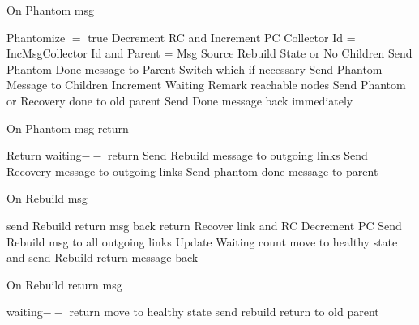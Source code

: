 \documentclass{article}
\begin{document}
\begin{algorithm}
\caption{On Phantom msg}
\label{Phantom message received}
\begin{algorithmic}[1]
\State Phantomize $=$ true
\State Decrement RC and Increment PC
\State Collector Id = IncMsgCollector Id and Parent = Msg Source
\If Rebuild State or No Children
\State Send Phantom Done message to Parent
\Else
\State Switch which if necessary
\State Send Phantom Message to Children
\State Increment Waiting
\EndIf
{}
\State Remark reachable nodes
\State Send Phantom or Recovery done to old parent
\Else
\State Send Done message back immediately
\EndIf
\EndProcedure
\end{algorithmic}
\end{algorithm}	
	
	
\begin{algorithm}
\caption{On Phantom msg return}
\label{Phantom Done message received}
\begin{algorithmic}[1]
\State Return
\EndIf
\State waiting$--$
\State return
\EndIf
{}
\State Send Rebuild message to outgoing links
\State Send Recovery message to outgoing links
\Else
\State Send phantom done message to parent
\EndIf
\EndProcedure
\end{algorithmic}
\end{algorithm}	


	
\begin{algorithm}
\caption{On Rebuild msg}
\label{Rebuild message received}
\begin{algorithmic}[1]
\State send Rebuild return msg back
\State return
\EndIf
\State Recover link and RC
\State Decrement PC
\State Send Rebuild msg to all outgoing links
\State Update Waiting count
\State move to healthy state and send Rebuild return message back
\EndIf
\EndProcedure
\end{algorithmic}
\end{algorithm}	



\begin{algorithm}
\caption{On Rebuild return msg}
\label{Rebuild return message received}
\begin{algorithmic}[1]
\State waiting$--$
\State return
\EndIf
\State move to healthy state
\State send rebuild return to old parent
\EndIf
\EndProcedure
\end{algorithmic}
\end{algorithm}	
\end{document}
